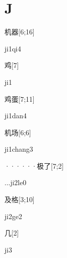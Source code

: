 ﻿%
\section*{J}

\begin{verbete}[ji1qi4]{机器}[6;16]
\begin{pronuncia}{ji1qi4}
\end{pronuncia}
\end{verbete}

\begin{verbete}[ji1]{鸡}[7]
\begin{pronuncia}{ji1}
\end{pronuncia}
\end{verbete}

\begin{verbete}[ji1dan4]{鸡蛋}[7;11]
\begin{pronuncia}{ji1dan4}
\end{pronuncia}
\end{verbete}

\begin{verbete}[ji1chang3]{机场}[6;6]
\begin{pronuncia}{ji1chang3}
\end{pronuncia}
\end{verbete}

\begin{verbete}[...ji2le0]{······极了}[7;2]
\begin{pronuncia}{...ji2le0}
\end{pronuncia}
\end{verbete}

\begin{verbete}[ji2ge2]{及格}[3;10]
\begin{pronuncia}{ji2ge2}
\end{pronuncia}
\end{verbete}

\begin{verbete}[ji3]{几}[2]
\begin{pronuncia}{ji3}
\end{pronuncia}
\end{verbete}

